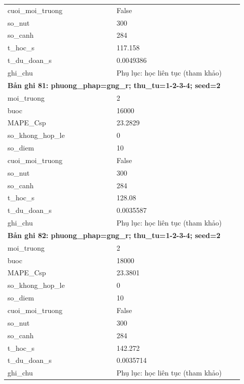 \begin{longtable}{p{0.43\linewidth}p{0.50\linewidth}}
cuoi\_\allowbreak moi\_\allowbreak truong & False \\
so\_\allowbreak nut & 300 \\
so\_\allowbreak canh & 284 \\
t\_\allowbreak hoc\_\allowbreak s & 117.158 \\
t\_\allowbreak du\_\allowbreak doan\_\allowbreak s & 0.0049386 \\
ghi\_\allowbreak chu & Phụ lục: học liên tục (tham khảo) \\
\midrule
\multicolumn{2}{p{0.95\linewidth}}{\textbf{Bản ghi 81: phuong\_phap=gng\_r; thu\_tu=1-2-3-4; seed=2}} \\
moi\_\allowbreak truong & 2 \\
buoc & 16000 \\
MAPE\_\allowbreak Csp & 23.2829 \\
so\_\allowbreak khong\_\allowbreak hop\_\allowbreak le & 0 \\
so\_\allowbreak diem & 10 \\
cuoi\_\allowbreak moi\_\allowbreak truong & False \\
so\_\allowbreak nut & 300 \\
so\_\allowbreak canh & 284 \\
t\_\allowbreak hoc\_\allowbreak s & 128.08 \\
t\_\allowbreak du\_\allowbreak doan\_\allowbreak s & 0.0035587 \\
ghi\_\allowbreak chu & Phụ lục: học liên tục (tham khảo) \\
\midrule
\multicolumn{2}{p{0.95\linewidth}}{\textbf{Bản ghi 82: phuong\_phap=gng\_r; thu\_tu=1-2-3-4; seed=2}} \\
moi\_\allowbreak truong & 2 \\
buoc & 18000 \\
MAPE\_\allowbreak Csp & 23.3801 \\
so\_\allowbreak khong\_\allowbreak hop\_\allowbreak le & 0 \\
so\_\allowbreak diem & 10 \\
cuoi\_\allowbreak moi\_\allowbreak truong & False \\
so\_\allowbreak nut & 300 \\
so\_\allowbreak canh & 284 \\
t\_\allowbreak hoc\_\allowbreak s & 142.272 \\
t\_\allowbreak du\_\allowbreak doan\_\allowbreak s & 0.0035714 \\
ghi\_\allowbreak chu & Phụ lục: học liên tục (tham khảo) \\

\end{longtable}
